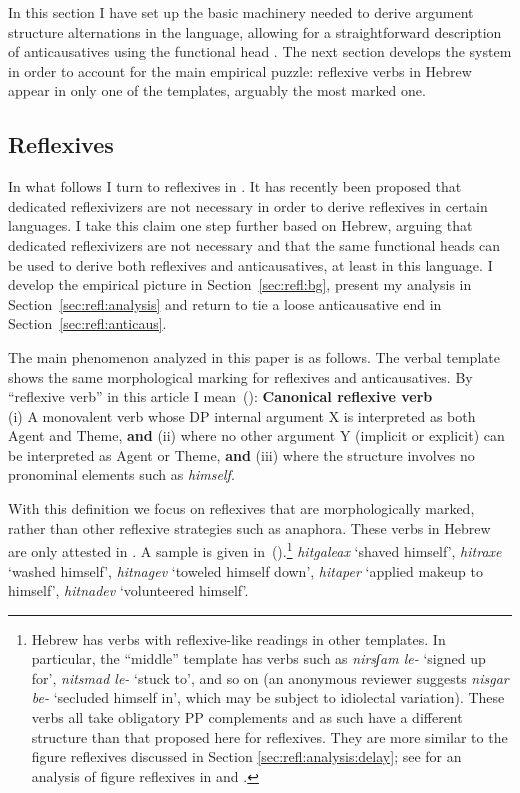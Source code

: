 In this section I have set up the basic machinery needed to derive argument structure alternations in the language, allowing for a straightforward description of anticausatives using the functional head {\vz}. The next section develops the system in order to account for the main empirical puzzle: reflexive verbs in Hebrew appear in only one of the templates, arguably the most marked one.

	\subsection{Reflexives}
In what follows I turn to reflexives in \thit. It has recently been proposed that dedicated reflexivizers are not necessary in order to derive reflexives in certain languages. I take this claim one step further based on Hebrew, arguing that dedicated reflexivizers are not necessary and that the same functional heads can be used to derive both reflexives and anticausatives, at least in this language. I develop the empirical picture in Section~\ref{sec:refl:bg}, present my analysis in Section~\ref{sec:refl:analysis} and return to tie a loose anticausative end in Section~\ref{sec:refl:anticaus}.


The main phenomenon analyzed in this paper is as follows. The verbal template {\thit} shows the same morphological marking for reflexives and anticausatives. By ``reflexive verb'' in this article I mean~(\nextx):
\ex \textbf{Canonical reflexive verb}\\
	(i) A monovalent verb whose DP internal argument X is interpreted as both Agent and Theme, \textbf{and} (ii) where no other argument Y (implicit or explicit) can be interpreted as Agent or Theme, \textbf{and} (iii) where the structure involves no pronominal elements such as \emph{himself}.
\xe

With this definition we focus on reflexives that are morphologically marked, rather than other reflexive strategies such as anaphora. These verbs in Hebrew are only attested in \thit. A sample is given in~(\nextx).\footnote{Hebrew has verbs with reflexive-like readings in other templates. In particular, the ``middle'' template {\tnif} has verbs such as \emph{nirsʃam le-} `signed up for', \emph{nitsmad le-} `stuck to', and so on (an anonymous reviewer suggests \emph{nisgar be-} `secluded himself in', which may be subject to idiolectal variation). These verbs all take obligatory PP complements and as such have a different structure than that proposed here for reflexives. They are more similar to the figure reflexives discussed in Section \ref{sec:refl:analysis:delay}; see \citet[Chapter~2.2]{kastner16phd} for an analysis of figure reflexives in {\tnif} and {\thit}.}
\ex\label{ex:refl}\emph{hitgaleax} `shaved himself', \emph{hitraxe\texttslig} `washed himself', \emph{hitnagev} `toweled himself down', \emph{hitaper} `applied makeup to himself', \emph{hitnadev} `volunteered himself'.
\xe

